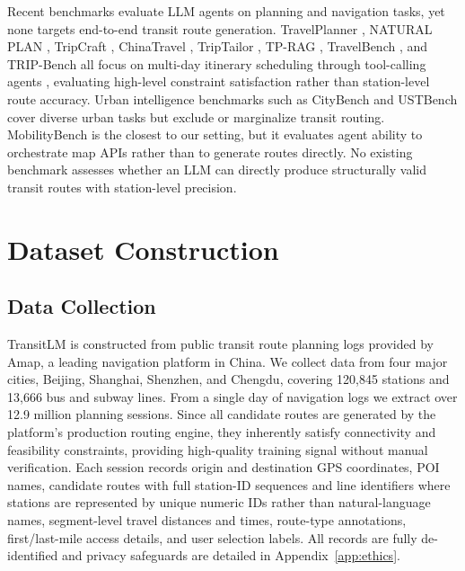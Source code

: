 \documentclass{llmxive}
\begin{document}
Recent benchmarks evaluate LLM agents on planning and navigation tasks, yet none targets end-to-end transit route generation. TravelPlanner \cite{xie2024travelplanner}, NATURAL PLAN \cite{zheng2024naturalplan}, TripCraft \cite{chaudhuri2025tripcraft}, ChinaTravel \cite{shao2024chinatravel}, TripTailor \cite{wang2025triptailor}, TP-RAG \cite{chen2025tprag}, TravelBench \cite{cheng2025travelbench}, and TRIP-Bench \cite{shen2026tripbench} all focus on multi-day itinerary scheduling through tool-calling agents \cite{schick2023toolformer}, evaluating high-level constraint satisfaction rather than station-level route accuracy. Urban intelligence benchmarks such as CityBench \cite{feng2025citybench} and USTBench \cite{lai2025ustbench} cover diverse urban tasks but exclude or marginalize transit routing. MobilityBench \cite{song2026mobilitybench} is the closest to our setting, but it evaluates agent ability to orchestrate map APIs rather than to generate routes directly. No existing benchmark assesses whether an LLM can directly produce structurally valid transit routes with station-level precision.

\section{Dataset Construction}
\label{dataset}

\subsection{Data Collection}
\label{sec:collection}

TransitLM is constructed from public transit route planning logs provided by Amap, a leading navigation platform in China. We collect data from four major cities, Beijing, Shanghai, Shenzhen, and Chengdu, covering 120,845 stations and 13,666 bus and subway lines. From a single day of navigation logs we extract over 12.9 million planning sessions. Since all candidate routes are generated by the platform's production routing engine, they inherently satisfy connectivity and feasibility constraints, providing high-quality training signal without manual verification. Each session records origin and destination GPS coordinates, POI names, candidate routes with full station-ID sequences and line identifiers where stations are represented by unique numeric IDs rather than natural-language names, segment-level travel distances and times, route-type annotations, first/last-mile access details, and user selection labels. All records are fully de-identified and privacy safeguards are detailed in Appendix~\ref{app:ethics}.
\end{document}
